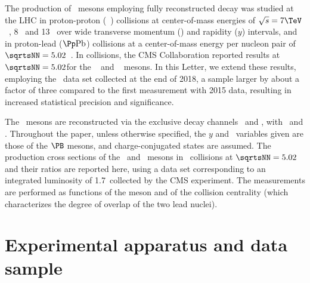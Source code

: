 The production of \PB\ mesons employing fully reconstructed decay was studied at the LHC in proton-proton (\pp\ ) collisions at center-of-mass energies of $\sqrts = 7\TeV$~\cite{CMSBmesonpp,Chatrchyan:2011pw,Chatrchyan:2011vh,ATLAS:2013cia,LHCb:2013JHEP,Aaij:2014hla,Aaij:2012dd}, 8\TeV~\cite{Aaij:2015fea,Aaij:2014ija} and 13\TeV~\cite{Khachatryan:2016csy} over wide transverse momentum (\pt) and rapidity ($y$) intervals, and in proton-lead ($\pPb$) collisions at a center-of-mass energy per nucleon pair of $\sqrtsNN = 5.02$\TeV~\cite{Khachatryan:2015uja}. In \PbPb collisions, the CMS Collaboration reported results at $\sqrtsNN = 5.02$\TeV for the \PBp~\cite{BpPbPbCMS} and \PBzs~\cite{BsPbPbCMS} mesons.
%
In this Letter, we extend these results, employing the \PbPb\ data set collected at the end of 2018, a sample larger by about a factor of three compared to the first measurement with 2015 data, resulting in increased statistical precision and significance.  

The \PB\ mesons are reconstructed via the exclusive decay channels \Bzerosdecay\ and \Bplusdecay, with \Jpsidecay\ and \phidecay.
Throughout the paper, unless otherwise specified, the $y$ and \pt\ variables given are those of the $\PB$ mesons, and charge-conjugated states are assumed. The production cross sections of the \PBzs\ and \PBp\ mesons in \PbPb\ collisions at $\sqrtsNN = 5.02$\TeV and their ratios are reported here, using a data set corresponding to an integrated luminosity of 1.7\nbinv\ collected by the CMS experiment.
The measurements are performed as functions of the meson \pt and of the \PbPb collision centrality (which characterizes the degree of overlap of the two lead nuclei).

\section{Experimental apparatus and data sample}

